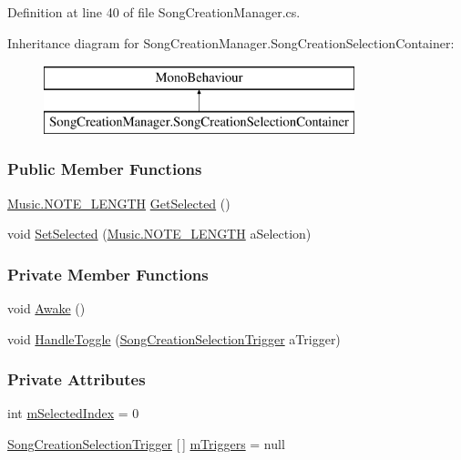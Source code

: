 Definition at line 40 of file Song\+Creation\+Manager.\+cs.

Inheritance diagram for Song\+Creation\+Manager.\+Song\+Creation\+Selection\+Container\+:\begin{figure}[H]
\begin{center}
\leavevmode
\includegraphics[height=2.000000cm]{group___s_c_m_nest_class}
\end{center}
\end{figure}
\subsubsection*{Public Member Functions}
\begin{DoxyCompactItemize}
\item 
\hyperlink{group___music_enums_gaf11b5f079adbb21c800b9eca1c5c3cbd}{Music.\+N\+O\+T\+E\+\_\+\+L\+E\+N\+G\+TH} \hyperlink{group___s_c_m_nest_class_ae73f2b2c2f567ecaf6ce10f85c30956a}{Get\+Selected} ()
\item 
void \hyperlink{group___s_c_m_nest_class_ab3d74be007528e4e6686f89e8e993b3b}{Set\+Selected} (\hyperlink{group___music_enums_gaf11b5f079adbb21c800b9eca1c5c3cbd}{Music.\+N\+O\+T\+E\+\_\+\+L\+E\+N\+G\+TH} a\+Selection)
\end{DoxyCompactItemize}
\subsubsection*{Private Member Functions}
\begin{DoxyCompactItemize}
\item 
void \hyperlink{group___s_c_m_nest_class_a786a838268b7102ae38c546100c3e6ac}{Awake} ()
\item 
void \hyperlink{group___s_c_m_nest_class_a534fec983fb7e5a7f948513672aa64b4}{Handle\+Toggle} (\hyperlink{group___s_c_m_nest_class_class_song_creation_manager_1_1_song_creation_selection_container_1_1_song_creation_selection_trigger}{Song\+Creation\+Selection\+Trigger} a\+Trigger)
\end{DoxyCompactItemize}
\subsubsection*{Private Attributes}
\begin{DoxyCompactItemize}
\item 
int \hyperlink{group___s_c_m_nest_class_a1684b25b3eb0e87f189996de22bf9792}{m\+Selected\+Index} = 0
\item 
\hyperlink{group___s_c_m_nest_class_class_song_creation_manager_1_1_song_creation_selection_container_1_1_song_creation_selection_trigger}{Song\+Creation\+Selection\+Trigger} \mbox{[}$\,$\mbox{]} \hyperlink{group___s_c_m_nest_class_aeda161975a8a683281b9388b2c905ae8}{m\+Triggers} = null
\end{DoxyCompactItemize}


